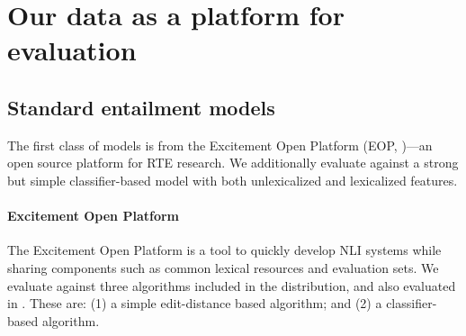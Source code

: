 \section{Our data as a platform for evaluation}


\subsection{Standard entailment models}

The first class of models is from the Excitement Open
  Platform (EOP,
  \citealt{pado2014design,magnini2014excitement})---an open source platform for RTE research.
We additionally evaluate against a strong but simple classifier-based model with
  both unlexicalized and lexicalized features.

%
%
\paragraph{Excitement Open Platform}
The Excitement Open Platform is a tool to quickly develop NLI systems
  while sharing components such as common lexical resources and 
  evaluation sets.
We evaluate against three algorithms included in the distribution,
  and also evaluated in .
These are: 
  (1) a simple edit-distance based algorithm; and
  (2) a classifier-based algorithm.

